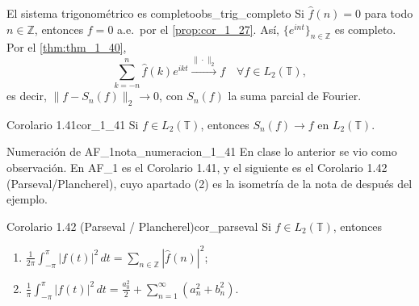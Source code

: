 \begin{observacion}{El sistema trigonométrico es completo}{obs_trig_completo}
Si $\hat{f}(n) = 0$ para todo $n \in \mathbb{Z}$, entonces $f = 0$ a.e.\ por el \cref{prop:cor_1_27}. Así, $\{e^{int}\}_{n\in\mathbb{Z}}$ es completo. Por el \cref{thm:thm_1_40},
\[
\sum_{k=-n}^{n}\hat{f}(k)e^{ikt} \xrightarrow{\|\cdot\|_2} f \quad \forall f \in L_2(\mathbb{T}),
\]
es decir, $\|f - S_n(f)\|_2 \to 0$, con $S_n(f)$ la suma parcial de Fourier.
\end{observacion}

\begin{proposicion}{Corolario 1.41}{cor_1_41}
Si $f \in L_2(\mathbb{T})$, entonces $S_n(f) \to f$ en $L_2(\mathbb{T})$.
\end{proposicion}

\begin{nota}{Numeración de AF\_1}{nota_numeracion_1_41}
En clase lo anterior se vio como observación. En AF\_1 es el Corolario 1.41, y el siguiente es el Corolario 1.42 (Parseval/Plancherel), cuyo apartado (2) es la isometría de la nota de después del ejemplo.
\end{nota}

\begin{proposicion}{Corolario 1.42 (Parseval / Plancherel)}{cor_parseval}
Si $f \in L_2(\mathbb{T})$, entonces
\begin{enumerate}
\item[(1)] $\displaystyle\frac{1}{2\pi}\int_{-\pi}^{\pi}|f(t)|^2\,dt = \sum_{n\in\mathbb{Z}}|\hat{f}(n)|^2$;
\item[(2)] $\displaystyle\frac{1}{\pi}\int_{-\pi}^{\pi}|f(t)|^2\,dt = \frac{a_0^2}{2} + \sum_{n=1}^{\infty}(a_n^2 + b_n^2)$.
\end{enumerate}
\end{proposicion}

